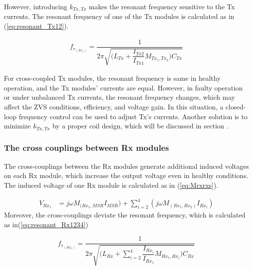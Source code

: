 \documentclass[journal]{IEEEtran}
\newcommand{\RomanNumeralCaps}[1]
    {\MakeUppercase{\romannumeral #1}}
\begin{document}
However, introducing $k_{Tx,Tx}$ makes the resonant frequency sensitive to the Tx currents. The resonant frequency of one of the Tx modules is calculated as in  (\ref{eq:resonant_Tx12}).

\begin{equation}
\begin{split}
    f_r_{(Tx_{1})}= \dfrac{1}{2\pi\sqrt{ \big(L_{Tx} +\dfrac{I_{Tx2}}{I_{Tx1}}M_{Tx_{1},Tx_{2}} \big )C_{Tx}}}  
    \end{split}
    \label{eq:resonant_Tx12}
\end{equation}

For cross-coupled Tx modules, the resonant frequency is same in healthy operation, and the Tx modules' currents are equal.
However, in faulty operation or under unbalanced Tx currents, the resonant frequency changes, which may affect the ZVS conditions, efficiency, and voltage gain. In this situation, a closed-loop frequency control can be used to adjust Tx's currents. Another solution is to minimize $k_{Tx,Tx}$ by a proper coil design, which will be discussed in section  \RomanNumeralCaps{7}. 


\subsubsection{The cross couplings between Rx modules}
The cross-couplings between the Rx modules generate additional induced voltages on each Rx module, which increase the output voltage even in healthy conditions.  
The induced voltage of one Rx module is calculated as in 
(\ref{eq:Mrxrxs}).

\begin{equation}
\begin{split}
    V_{Rx_{1}}&=j\omega M_{({Rx_{1},MSR}} I_{MSR})
               +\sum^{4}_{i=2}(j\omega M_{({Rx_{1},Rx_{2}})}I_{Rx_i})
\end{split} 
\label{eq:Mrxrxs}
\end{equation}
Moreover, the cross-couplings deviate the resonant frequency, which is calculated as in(\ref{eq:resonant_Rx1234})

\begin{equation}
    f_r_{(Rx_{1})}= \dfrac{1}{2\pi\sqrt{ 
      \Big (L_{Rx} + \sum^{4}_{i=2}  \dfrac{I_{Rx_i}}{I_{Rx_1}}M_{Rx_{1},Rx_{i}}  \Big) C_{Rx}  } }
    \label{eq:resonant_Rx1234}
\end{equation}
\end{document}
